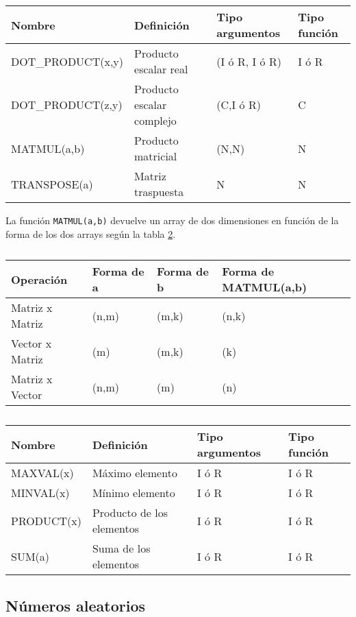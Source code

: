 \begin{table}[h!] \centering
	\begin{tabular}{l|l|l|l}
		Nombre & Definición  & Tipo argumentos & Tipo función \\ \hline
		DOT\_PRODUCT(x,y) & Producto escalar real & (I ó R, I ó R) & I ó R \\
		DOT\_PRODUCT(z,y) & Producto escalar complejo & (C,I ó R) & C \\
		MATMUL(a,b) & Producto matricial & (N,N) & N \\
		TRANSPOSE(a) & Matriz traspuesta & N & N 
	\end{tabular}
	\caption{}
	\label{Tab:01-05}
\end{table}

La función  {\tt MATMUL(a,b)} devuelve un array de dos dimensiones en función de la forma de los dos arrays según la tabla \ref{Tab:01-06}.


\begin{table}[h!] \centering
	\begin{tabular}{l|l|l|l}
		Operación & Forma de a & Forma de b & Forma de MATMUL(a,b) \\ \hline
		Matriz x Matriz & (n,m) & (m,k) & (n,k) \\
 		Vector x Matriz & (m) & (m,k) & (k) \\
		Matriz x Vector & (n,m) & (m) & (n) \\
	\end{tabular}
	\caption{}
	\label{Tab:01-06}
\end{table}

\begin{table}[h!] \centering
	\begin{tabular}{l|l|l|l}
		Nombre & Definición &  Tipo argumentos & Tipo función \\  \hline
		MAXVAL(x) & Máximo elemento & I ó R & I ó R \\
		MINVAL(x) & Mínimo elemento & I ó R & I ó R \\
		PRODUCT(x) & Producto de los elementos & I ó R & I ó R \\
		SUM(a) & Suma de los elementos & I ó R & I ó R
	\end{tabular}
	\caption{}
	\label{Tab:01-07}
\end{table}
\newpage

\subsection{Números aleatorios}

